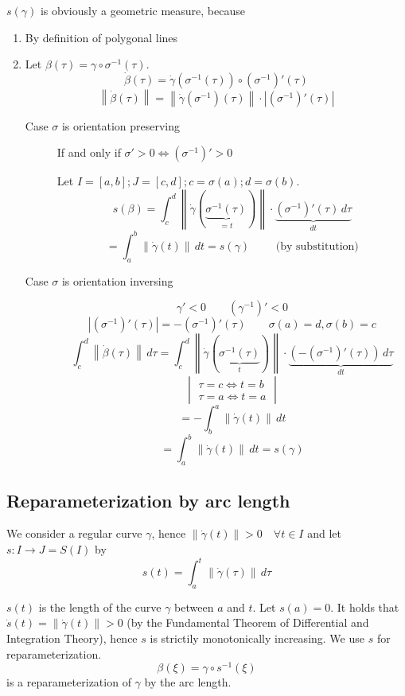\documentclass[a4paper,landscape,twocolumn]{article}
\theoremstyle{definition}
\newcommand\abs[1]{\left|#1\right|}
\newcommand\norm[1]{\left\|#1\right\|}
\begin{document}
$s(\gamma)$ is obviously a geometric measure, because
\begin{enumerate}
  \item By definition of polygonal lines
  \item Let $\beta(\tau) = \gamma \circ \sigma^{-1}(\tau)$.
    \[ \dot{\beta}(\tau) = \dot{\gamma}(\sigma^{-1}(\tau)) \circ (\sigma^{-1})'(\tau) \]
    \[ \norm{\dot\beta(\tau)} = \norm{\dot\gamma(\sigma^{-1})(\tau)} \cdot \abs{(\sigma^{-1})'(\tau)} \]
    \begin{description}
      \item[Case $\sigma$ is orientation preserving]
        If and only if $\sigma' > 0 \Leftrightarrow (\sigma^{-1})' > 0$

        Let $I = [a,b]; J = [c,d]; c = \sigma(a); d = \sigma(b)$.
        \[ s(\beta) = \int_c^d \norm{\dot\gamma(\underbrace{\sigma^{-1}(\tau)}_{= t})} \cdot \underbrace{(\sigma^{-1})' (\tau) \, d\tau}_{dt} \]
        \[ = \int_a^b \norm{\dot\gamma(t)} \, dt = s(\gamma) \qquad \text{ (by substitution)} \]
      \item[Case $\sigma$ is orientation inversing]
        \[ \gamma' < 0 \qquad (\gamma^{-1})' < 0 \]
        \[ \abs{(\sigma^{-1})'(\tau)} = -(\sigma^{-1})'(\tau) \qquad \sigma(a) = d, \sigma(b) = c \]
        \[
          \int_c^d \norm{\dot\beta(\tau)} \, d\tau
          = \int_c^d \norm{\dot\gamma(\underbrace{\sigma^{-1}(\tau)}_{t})} \cdot \underbrace{\left(- (\sigma^{-1})'(\tau)\right)\, d\tau}_{dt}
        \] \[
          \begin{vmatrix}
            \tau = c \Leftrightarrow t = b \\
            \tau = a \Leftrightarrow t=  a
          \end{vmatrix}
        \] \[
          = -\int_b^a \norm{\dot\gamma(t)} \, dt
        \] \[
          = \int_a^b \norm{\dot\gamma(t)} \, dt = s(\gamma)
        \]
    \end{description}
\end{enumerate}

\subsection{Reparameterization by arc length}
%
We consider a regular curve $\gamma$, hence $\norm{\dot\gamma(t)} > 0 \quad \forall t \in I$
and let $s: I \to J = S(I)$ by
\[ s(t) = \int_a^t \norm{\dot\gamma(\tau)} \, d\tau \]

$s(t)$ is the length of the curve $\gamma$ between $a$ and $t$. Let $s(a) = 0$.
It holds that $\dot{s}(t) = \norm{\dot\gamma(t)} > 0$ (by the Fundamental Theorem of Differential and Integration Theory), hence $s$ is strictily monotonically increasing.
We use $s$ for reparameterization.
\[ \beta(\xi) = \gamma \circ s^{-1}(\xi) \]
is a reparameterization of $\gamma$ by the arc length.
\end{document}
